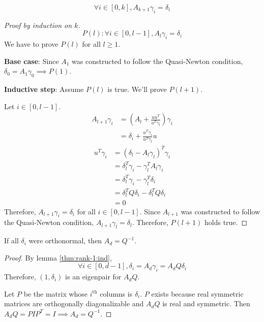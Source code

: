 \begin{lemma} \label{thm:rank-1:ind}
\[ \forall i \in [0, k], A_{k+1}\gamma_i = \delta_i \]
\end{lemma}
\begin{proof}[Proof by induction on $k$]
\[ P(l): \forall i \in [0, l-1], A_l\gamma_i = \delta_i \]
We have to prove $P(l)$ for all $l \ge 1$.

\textbf{Base case}:
Since $A_1$ was constructed to follow the Quasi-Newton condition,
$\delta_0 = A_1\gamma_0 \implies P(1)$.

\textbf{Inductive step}:
Assume $P(l)$ is true. We'll prove $P(l+1)$.

Let $i \in [0, l-1]$.
\begin{align*}
A_{l+1}\gamma_i &= \left( A_l + \frac{uu^T}{u^T\gamma_l} \right)\gamma_i
\tag{here $u = \delta_l - A_l\gamma_l$}
\\ &= \delta_i + \frac{u^T\gamma_i}{u^T\gamma_l}u
\tag{$A_l\gamma_i = \delta_i$ by induction hypothesis}
\end{align*}
\begin{align*}
u^T\gamma_i &= (\delta_l - A_l\gamma_l)^T\gamma_i
\\ &= \delta_l^T\gamma_i - \gamma_l^TA_l\gamma_i
\\ &= \delta_l^T\gamma_i - \gamma_l^T\delta_i \tag{by induction hypothesis}
\\ &= \delta_l^TQ\delta_i - \delta_l^TQ\delta_i \tag{$\forall j, \gamma_j = Q\delta_j$}
\\ &= 0
\end{align*}
Therefore, $A_{l+1}\gamma_i = \delta_i$ for all $i \in [0, l-1]$.
Since $A_{l+1}$ was constructed to follow the Quasi-Newton condition,
$A_{l+1}\gamma_l = \delta_l$. Therefore, $P(l+1)$ holds true.
\end{proof}

\begin{lemma}
If all $\delta_i$ were orthonormal, then $A_d = Q^{-1}$.
\end{lemma}
\begin{proof}
By lemma \ref{thm:rank-1:ind},
\[ \forall i \in [0, d-1], \delta_i = A_d\gamma_i = A_dQ\delta_i \]
Therefore, $(1, \delta_i)$ is an eigenpair for $A_dQ$.

Let $P$ be the matrix whose $i^{\textrm{th}}$ columns is $\delta_i$.
$P$ exists because real symmetric matrices are orthogonally diagonalizable
and $A_dQ$ is real and symmetric.
Then $A_dQ = PIP^T = I \implies A_d = Q^{-1}$.
\end{proof}

